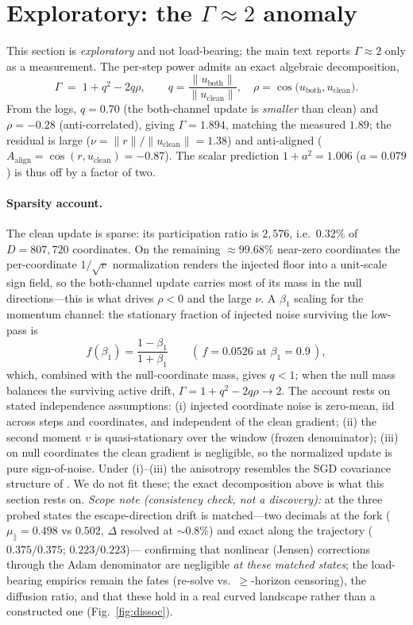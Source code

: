 \documentclass[10pt]{article}
\newcommand{\mupar}{\mu_{\parallel}}
\newcommand{\gam}{\Gamma}
\begin{document}
\section{Exploratory: the $\gam\approx2$ anomaly}
\label{app:gamma}
This section is \emph{exploratory} and not load-bearing; the main text reports
$\gam\approx2$ only as a measurement. The per-step power admits an exact algebraic
decomposition,
\[
\gam \;=\; 1 + q^2 - 2q\rho,\qquad
q=\frac{\lVert u_{\text{both}}\rVert}{\lVert u_{\text{clean}}\rVert},\quad
\rho=\cos\!\big(u_{\text{both}},u_{\text{clean}}\big).
\]
From the logs, $q=0.70$ (the both-channel update is \emph{smaller} than clean)
and $\rho=-0.28$ (anti-correlated), giving $\gam=1.894$, matching the measured
$1.89$; the residual is large ($\nu=\lVert r\rVert/\lVert u_{\text{clean}}\rVert
=1.38$) and anti-aligned ($A_{\text{align}}=\cos(r,u_{\text{clean}})=-0.87$). The
scalar prediction $1+a^2=1.006$ ($a=0.079$) is thus off by a factor of two.

\paragraph{Sparsity account.}
The clean update is sparse: its participation ratio is $2{,}576$, i.e.\ $0.32\%$
of $D=807{,}720$ coordinates. On the remaining $\approx99.68\%$ near-zero
coordinates the per-coordinate $1/\sqrt{v}$ normalization renders the injected
floor into a unit-scale sign field, so the both-channel update carries most of
its mass in the null directions---this is what drives $\rho<0$ and the large
$\nu$. A $\beta_1$ scaling for the momentum channel: the stationary fraction of
injected noise surviving the low-pass is
\[
f(\beta_1)=\frac{1-\beta_1}{1+\beta_1}\qquad(\,f=0.0526\text{ at }\beta_1=0.9\,),
\]
which, combined with the null-coordinate mass, gives $q<1$; when the null mass
balances the surviving active drift, $\gam=1+q^2-2q\rho\to2$. The account rests on
stated independence assumptions: (i) injected coordinate noise is zero-mean, iid
across steps and coordinates, and independent of the clean gradient; (ii) the
second moment $v$ is quasi-stationary over the window (frozen denominator); (iii)
on null coordinates the clean gradient is negligible, so the normalized update is
pure sign-of-noise. Under (i)--(iii) the anisotropy resembles the SGD covariance
structure of \citet{zhu,wenfisher,ziyin}. We do not fit these; the exact
decomposition above is what this section rests on. \emph{Scope note (consistency
check, not a discovery):} at the three probed states the escape-direction drift
is matched---two decimals at the fork ($\mupar=0.498$ vs $0.502$, $\Delta$ resolved
at $\sim\!0.8\%$) and exact along the trajectory ($0.375/0.375$; $0.223/0.223$)---
confirming that nonlinear (Jensen) corrections through the Adam denominator are
negligible \emph{at these matched states}; the load-bearing empirics remain the
fates (re-solve vs.\ $\ge$-horizon censoring), the diffusion ratio, and that these
hold in a real curved landscape rather than a constructed one
(Fig.~\ref{fig:dissoc}).
\end{document}

